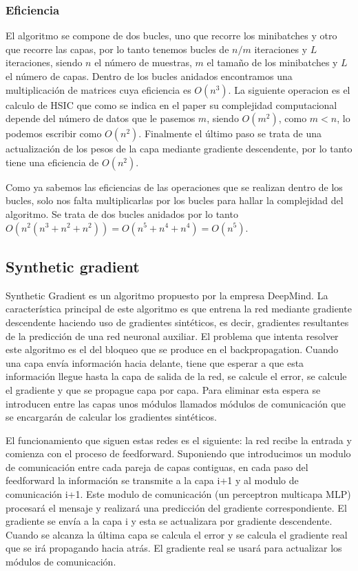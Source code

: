 \subsubsection{Eficiencia}


El algoritmo se compone de dos bucles, uno que recorre los minibatches y otro que recorre las capas, por lo tanto tenemos bucles de $n/m$ iteraciones y $L$ iteraciones, siendo $n$ el número de muestras, $m$ el tamaño de los minibatches y $L$ el número de capas. Dentro de los bucles anidados encontramos una multiplicación de matrices cuya eficiencia es $O(n^3)$. La siguiente operacion es el calculo de HSIC que como se indica en el paper su complejidad computacional depende del número de datos que le pasemos $m$, siendo $O(m^2)$, como $m < n$, lo podemos escribir como $O(n^2)$. Finalmente el último paso se trata de una actualización de los pesos de la capa mediante gradiente descendente, por lo tanto tiene una eficiencia de $O(n^2)$. 

Como ya sabemos las eficiencias de las operaciones que se realizan dentro de los bucles, solo nos falta multiplicarlas por los bucles para hallar la complejidad del algoritmo. Se trata de dos bucles anidados por lo tanto $O(n^{2}(n^{3}+n^{2}+n^{2})) = O(n^{5}+n^{4}+n^{4}) = O(n^{5})$.


\subsection{Synthetic gradient}

Synthetic Gradient es un algoritmo propuesto por la empresa DeepMind. La característica principal de este algoritmo es que entrena la red mediante gradiente descendente haciendo uso de gradientes sintéticos, es decir, gradientes resultantes de la predicción de una red neuronal auxiliar. El problema que intenta resolver este algoritmo es el del bloqueo que se produce en el backpropagation. Cuando una capa envía información hacia delante, tiene que esperar a que esta información llegue hasta la capa de salida de la red, se calcule el error, se calcule el gradiente y que se propague capa por capa. Para eliminar esta espera se introducen entre las capas unos módulos llamados módulos de comunicación que se encargarán de calcular los gradientes sintéticos. 

El funcionamiento que siguen estas redes es el siguiente: la red recibe la entrada y comienza con el proceso de feedforward. Suponiendo que introducimos un modulo de comunicación entre cada pareja de capas contiguas, en cada paso del feedforward la información se transmite a la capa i+1 y al modulo de comunicación i+1. Este modulo de comunicación (un perceptron multicapa MLP) procesará el mensaje y realizará una predicción del gradiente correspondiente. El gradiente se envía a la capa i y esta se actualizara por gradiente descendente. Cuando se alcanza la última capa se calcula el error y se calcula el gradiente real que se irá propagando hacia atrás. El gradiente real se usará para actualizar los módulos de comunicación.

